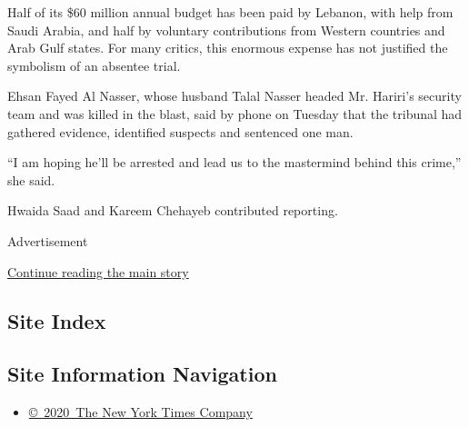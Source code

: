 Half of its \$60 million annual budget has been paid by Lebanon, with
help from Saudi Arabia, and half by voluntary contributions from Western
countries and Arab Gulf states. For many critics, this enormous expense
has not justified the symbolism of an absentee trial.

Ehsan Fayed Al Nasser, whose husband Talal Nasser headed Mr. Hariri's
security team and was killed in the blast, said by phone on Tuesday that
the tribunal had gathered evidence, identified suspects and sentenced
one man.

``I am hoping he'll be arrested and lead us to the mastermind behind
this crime,'' she said.

Hwaida Saad and Kareem Chehayeb contributed reporting.

Advertisement

\protect\hyperlink{after-bottom}{Continue reading the main story}

\hypertarget{site-index}{%
\subsection{Site Index}\label{site-index}}

\hypertarget{site-information-navigation}{%
\subsection{Site Information
Navigation}\label{site-information-navigation}}

\begin{itemize}
\tightlist
\item
  \href{https://help.nytimes3xbfgragh.onion/hc/en-us/articles/115014792127-Copyright-notice}{©~2020~The
  New York Times Company}
\end{itemize}


